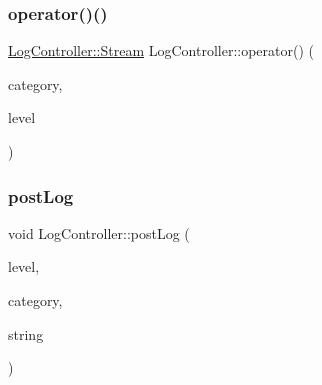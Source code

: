 \subsubsection{\texorpdfstring{operator()()}{operator()()}}
{\footnotesize\ttfamily \mbox{\hyperlink{class_q_g_b_a_1_1_log_controller_1_1_stream}{Log\+Controller\+::\+Stream}} Log\+Controller\+::operator() (\begin{DoxyParamCaption}\item[{\mbox{\hyperlink{ioapi_8h_a787fa3cf048117ba7123753c1e74fcd6}{int}}}]{category,  }\item[{\mbox{\hyperlink{ioapi_8h_a787fa3cf048117ba7123753c1e74fcd6}{int}}}]{level }\end{DoxyParamCaption})}

\mbox{\label{class_q_g_b_a_1_1_log_controller_a92daac6ce0f52df639ee8911d0de82c7}} 
\subsubsection{\texorpdfstring{post\+Log}{postLog}}
{\footnotesize\ttfamily void Log\+Controller\+::post\+Log (\begin{DoxyParamCaption}\item[{\mbox{\hyperlink{ioapi_8h_a787fa3cf048117ba7123753c1e74fcd6}{int}}}]{level,  }\item[{\mbox{\hyperlink{ioapi_8h_a787fa3cf048117ba7123753c1e74fcd6}{int}}}]{category,  }\item[{const Q\+String \&}]{string }\end{DoxyParamCaption})\hspace{0.3cm}{\ttfamily [slot]}}

